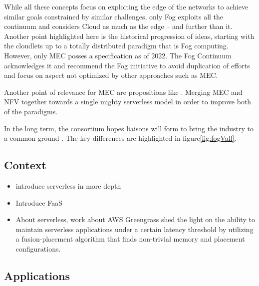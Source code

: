 \documentclass[11pt]{sdm}
\begin{document}
While all these concepts focus on exploiting the edge of the networks to achieve similar goals constrained by similar challenges, only Fog exploits all the continuum and considers Cloud as much as the edge -- and further than it. Another point highlighted here is the historical progression of ideas, starting with the cloudlets up to a totally distributed paradigm that is Fog computing. However, only \gls{MEC} posses a specification as of 2022. The Fog Continuum acknowledges it and recommend the Fog initiative to avoid duplication of efforts and focus on aspect not optimized by other approaches such as \gls{MEC}. 

Another point of relevance for \gls{MEC} are propositions like . Merging \gls{MEC} and \gls{NFV} together towards a single mighty serverless model in order to improve both of the paradigms.

In the long term, the consortium hopes liaisons will form to bring the industry to a common ground \cite{ieee_standards_association_ieee_2018}. The key differences are highlighted in  figure\ref{fig:fogVall}.

\subsection {Context}
\begin{itemize}
	\item introduce serverless in more depth
	\item Introduce \gls{FaaS}
	\item About serverless,  work about AWS Greengrass shed the light on the ability to maintain serverless applications under a certain latency threshold by utilizing a fusion-placement algorithm that finds non-trivial memory and placement configurations.
\end{itemize}

\subsection {Applications}
\end{document}

